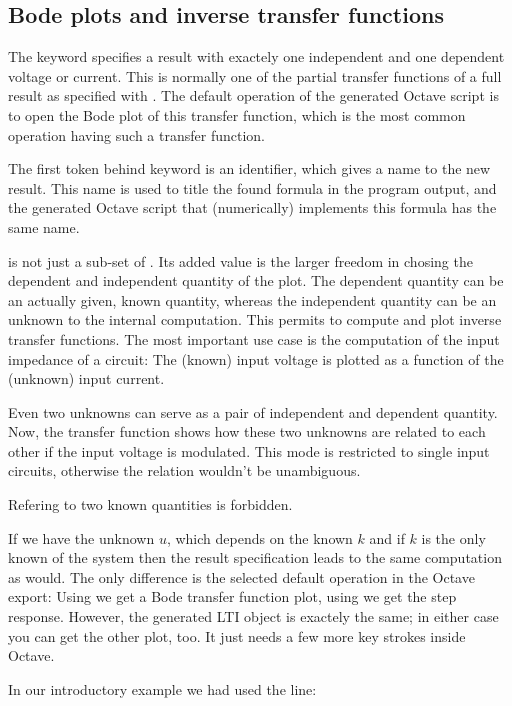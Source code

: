 \subsection{Bode plots and inverse transfer functions}

The keyword  specifies a result with exactely one independent
and one dependent voltage or current. This is normally one of the partial
transfer functions of a full result as specified with . The
default operation of the generated Octave script is to open the Bode plot
of this transfer function, which is the most common operation having such a
transfer function.

The first token behind keyword  is an identifier, which gives a
name to the new result. This name is used to title the found formula in
the program output, and the generated Octave script that (numerically)
implements this formula has the same name.

 is not just a sub-set of . Its added value is the
larger freedom in chosing the dependent and independent quantity of the
plot. The dependent quantity can be an actually given, known quantity,
whereas the independent quantity can be an unknown to the internal
computation. This permits to compute and plot inverse transfer functions.
The most important use case is the computation of the input impedance of a
circuit: The (known) input voltage is plotted as a function of the
(unknown) input current.

Even two unknowns can serve as a pair of independent and dependent
quantity. Now, the transfer function shows how these two unknowns are
related to each other if the input voltage is modulated. This mode is
restricted to single input circuits, otherwise the relation wouldn't be
unambiguous.

Refering to two known quantities is forbidden.

If we have the unknown $u$, which depends on the known $k$ and if
$k$ is the only known of the system then the result specification
 leads to the same computation as 
would. The only difference is the selected default operation in the Octave
export: Using  we get a Bode transfer function plot, using
 we get the step response. However, the generated LTI object is
exactely the same; in either case you can get the other plot, too. It just
needs a few more key strokes inside Octave.

In our introductory example we had used the line:

